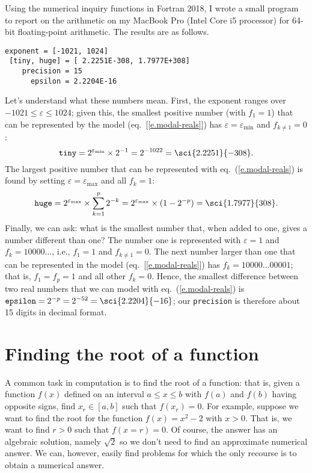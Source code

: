Using the numerical inquiry functions in Fortran 2018, I wrote a small program to report on the arithmetic on my MacBook Pro (Intel Core i5 processor) for 64-bit floating-point arithmetic. The results are as follows.
\begin{Verbatim}[numbers=none]
     exponent = [-1021, 1024]
 [tiny, huge] = [ 2.2251E-308, 1.7977E+308]
    precision = 15
      epsilon = 2.2204E-16
\end{Verbatim}
Let's understand what these numbers mean.
First, the exponent ranges over $-1021\le\varepsilon\le1024$;%
given this, the smallest positive number (with $f_{1}=1$) that can be represented by the model (eq.~[\ref{e.modal-reals}]) has $\varepsilon = \varepsilon_{\min}$ and $f_{k\neq 1} = 0$:
\[\mathtt{tiny} = 2^{\varepsilon_{\min}}\times 2^{-1} = 2^{-1022} = \sci{2.2251}{-308}.\]
The largest positive number that can be represented with eq.~(\ref{e.modal-reals}) is found by setting $\varepsilon=\varepsilon_{\max}$ and all $f_{k}=1$:
\[
\mathtt{huge} = 2^{\varepsilon_{\max}}\times \sum_{k=1}^{p} 2^{-k} = 2^{\varepsilon_{\max}}\times(1-2^{-p}) = \sci{1.7977}{308}.
\]
Finally, we can ask: what is the smallest number that, when added to one, gives a number different than one? The number one is represented with $\varepsilon = 1$ and $f_{k} = 10000\ldots$, i.e., $f_{1}=1$ and $f_{k\neq1}=0$. The next number larger than one that can be represented in the model (eq.~[\ref{e.modal-reals}]) has $f_{k} = 10000\ldots00001$; that is, $f_{1}=f_{p}=1$ and all other $f_{k}=0$. Hence, the smallest difference between two real numbers that we can model with eq.~(\ref{e.modal-reals}) is $\mathtt{epsilon} = 2^{-p} = 2^{-52} = \sci{2.2204}{-16}$; our \verb+precision+ is therefore about 15 digits in decimal format.

\section{Finding the root of a function}
A common task in computation is to find the root of a function: that is, given a function $f(x)$ defined on an interval $a\le x\le b$ with $f(a)$ and $f(b)$ having opposite signs, find $x_{r}\in[a,b]$ such that $f(x_{r}) = 0$.
For example, suppose we want to find the root for the function $f(x) = x^2-2$ with $x > 0$. That is, we want to find $r > 0$ such that $f(x=r) = 0$. Of course, the answer has an algebraic solution, namely $\sqrt{2}$ so we don't need to find an approximate numerical answer. We can, however, easily find problems for which the only recourse is to obtain a numerical answer.

